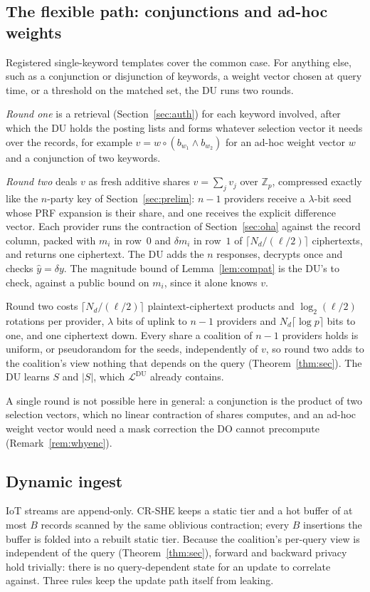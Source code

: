 \documentclass[a4paper,fleqn]{cas-dc}
\newcommand{\Leak}{\mathcal{L}}
\begin{document}
\subsection{The flexible path: conjunctions and ad-hoc weights}
\label{sec:flex}
Registered single-keyword templates cover the common case. For anything else,
such as a conjunction or disjunction of keywords, a weight vector chosen at
query time, or a threshold on the matched set, the DU runs two rounds.

\emph{Round one} is a retrieval (Section~\ref{sec:auth}) for each keyword
involved, after which the DU holds the posting lists and forms whatever
selection vector it needs over the records, for example
$v=w\circ(b_{w_1}\wedge b_{w_2})$ for an ad-hoc weight vector $w$ and a
conjunction of two keywords.

\emph{Round two} deals $v$ as fresh additive shares $v=\sum_jv_j$ over
$\mathbb{Z}_p$, compressed exactly like the $n$-party key of
Section~\ref{sec:prelim}: $n-1$ providers receive a $\lambda$-bit seed whose
PRF expansion is their share, and one receives the explicit difference vector.
Each provider runs the contraction of Section~\ref{sec:oha} against the record
column, packed with $m_i$ in row~$0$ and $\delta m_i$ in row~$1$ of
$\lceil N_d/(\ell/2)\rceil$ ciphertexts, and returns one ciphertext. The DU
adds the $n$ responses, decrypts once and checks $\hat y=\delta y$. The
magnitude bound of Lemma~\ref{lem:compat} is the DU's to check, against a
public bound on $m_i$, since it alone knows $v$.

Round two costs $\lceil N_d/(\ell/2)\rceil$ plaintext-ciphertext products and
$\log_2(\ell/2)$ rotations per provider, $\lambda$ bits of uplink to $n-1$
providers and $N_d\lceil\log p\rceil$ bits to one, and one ciphertext down.
Every share a coalition of $n-1$ providers holds is uniform, or pseudorandom
for the seeds, independently of $v$, so round two adds to the coalition's view
nothing that depends on the query (Theorem~\ref{thm:sec}). The DU learns $S$
and $|S|$, which $\Leak^{\text{DU}}$ already contains.

A single round is not possible here in general: a conjunction is the product
of two selection vectors, which no linear contraction of shares computes, and
an ad-hoc weight vector would need a mask correction the DO cannot precompute
(Remark~\ref{rem:whyenc}).

\subsection{Dynamic ingest}
\label{sec:ingest}
IoT streams are append-only. CR-SHE keeps a static tier and a hot buffer of at
most $B$ records scanned by the same oblivious contraction; every $B$
insertions the buffer is folded into a rebuilt static tier. Because the
coalition's per-query view is independent of the query
(Theorem~\ref{thm:sec}), forward and backward privacy hold trivially: there is
no query-dependent state for an update to correlate against. Three rules keep
the update path itself from leaking.
\end{document}
